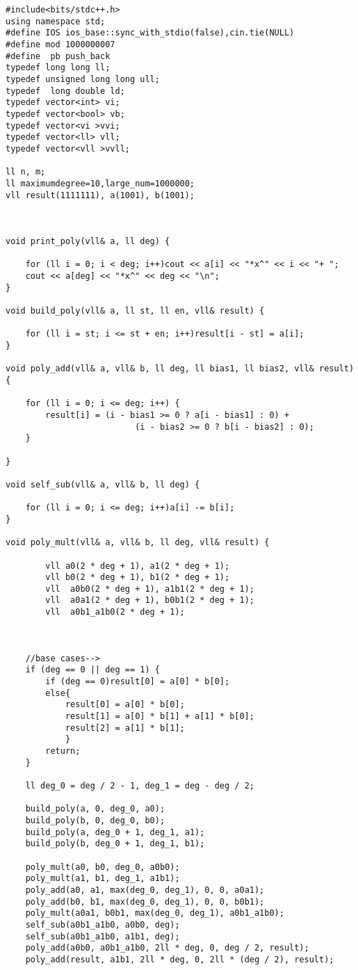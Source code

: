 \documentclass[10pt]{article}
\begin{document}
\begin{lstlisting}
#include<bits/stdc++.h>
using namespace std;
#define IOS ios_base::sync_with_stdio(false),cin.tie(NULL)
#define mod 1000000007
#define  pb push_back
typedef long long ll;
typedef unsigned long long ull;
typedef  long double ld;
typedef vector<int> vi;
typedef vector<bool> vb;
typedef vector<vi >vvi;
typedef vector<ll> vll;
typedef vector<vll >vvll;

ll n, m;
ll maximumdegree=10,large_num=1000000;
vll result(1111111), a(1001), b(1001);



void print_poly(vll& a, ll deg) {

	for (ll i = 0; i < deg; i++)cout << a[i] << "*x^" << i << "+ ";
	cout << a[deg] << "*x^" << deg << "\n";
}

void build_poly(vll& a, ll st, ll en, vll& result) {

	for (ll i = st; i <= st + en; i++)result[i - st] = a[i];
}

void poly_add(vll& a, vll& b, ll deg, ll bias1, ll bias2, vll& result) {

	for (ll i = 0; i <= deg; i++) {
		result[i] = (i - bias1 >= 0 ? a[i - bias1] : 0) +
                          (i - bias2 >= 0 ? b[i - bias2] : 0);
	}

}

void self_sub(vll& a, vll& b, ll deg) {

	for (ll i = 0; i <= deg; i++)a[i] -= b[i];
}

void poly_mult(vll& a, vll& b, ll deg, vll& result) {

    	vll a0(2 * deg + 1), a1(2 * deg + 1);
        vll b0(2 * deg + 1), b1(2 * deg + 1);
        vll  a0b0(2 * deg + 1), a1b1(2 * deg + 1);
        vll  a0a1(2 * deg + 1), b0b1(2 * deg + 1);
        vll  a0b1_a1b0(2 * deg + 1);



	//base cases-->
	if (deg == 0 || deg == 1) {
		if (deg == 0)result[0] = a[0] * b[0];
		else{
			result[0] = a[0] * b[0];
            result[1] = a[0] * b[1] + a[1] * b[0];
            result[2] = a[1] * b[1];
            }
		return;
	}

	ll deg_0 = deg / 2 - 1, deg_1 = deg - deg / 2;

    build_poly(a, 0, deg_0, a0);
    build_poly(b, 0, deg_0, b0);
    build_poly(a, deg_0 + 1, deg_1, a1);
    build_poly(b, deg_0 + 1, deg_1, b1);

	poly_mult(a0, b0, deg_0, a0b0);
	poly_mult(a1, b1, deg_1, a1b1);
	poly_add(a0, a1, max(deg_0, deg_1), 0, 0, a0a1);
    poly_add(b0, b1, max(deg_0, deg_1), 0, 0, b0b1);
	poly_mult(a0a1, b0b1, max(deg_0, deg_1), a0b1_a1b0);
	self_sub(a0b1_a1b0, a0b0, deg);
    self_sub(a0b1_a1b0, a1b1, deg);
	poly_add(a0b0, a0b1_a1b0, 2ll * deg, 0, deg / 2, result);
	poly_add(result, a1b1, 2ll * deg, 0, 2ll * (deg / 2), result);


\end{lstlisting}
\end{document}
